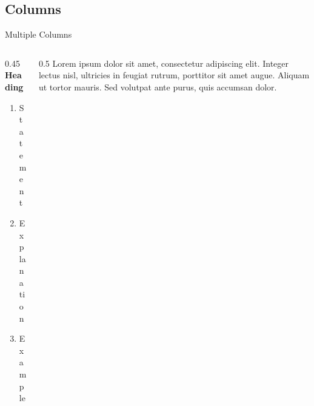 \documentclass[11pt]{beamer}
\begin{document}
\subsection{Columns}
\begin{frame}{Multiple Columns}
	\begin{columns}[c] %
		\begin{column}{0.45\textwidth} %
			\textbf{Heading}
			\begin{enumerate}
				\item Statement
				\item Explanation
				\item Example
			\end{enumerate}
		\end{column}
		\begin{column}{0.5\textwidth} %
			Lorem ipsum dolor sit amet, consectetur adipiscing elit. Integer lectus nisl, ultricies in feugiat rutrum, porttitor sit amet augue. Aliquam ut tortor mauris. Sed volutpat ante purus, quis accumsan dolor.
		\end{column}
	\end{columns}
\end{frame}
\end{document}
